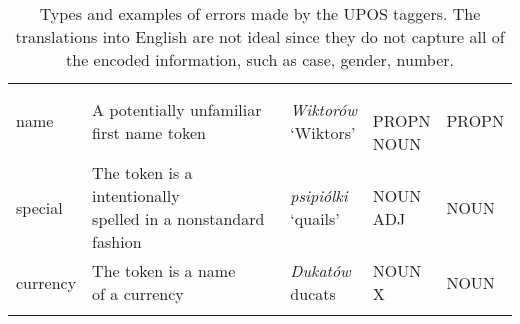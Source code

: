 \begin{longtable}[H]{p{2cm}p{4.5cm}p{3.5cm}p{1.75cm}p{1.75cm}}
name & \makecell[l]{A potentially unfamiliar \\ first name token} & \makecell[l]{\textit{Wiktorów} \\ `Wiktors'} & \makecell[l]{\\ PROPN \\ NOUN} & PROPN \\ 

special & \makecell[l]{The token is a intentionally \\ spelled in a nonstandard \\ fashion} & \makecell[l]{\textit{psipiólki} \\ `quails'} & \makecell[l]{NOUN \\ ADJ} & NOUN \\ 

currency & \makecell[l]{The token is a name \\ of a currency} & \makecell[l]{\textit{Dukatów} \\ ducats} & \makecell[l]{NOUN \\ X} & NOUN \\

\bottomrule
\caption{\label{table:error-type-upos-explanations} Types and examples of errors made by the UPOS taggers. The translations into English are not ideal since they do not capture all of the encoded information, such as case, gender, number.}
\end{longtable}
\newpage

